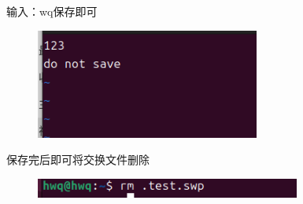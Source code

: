 \documentclass[a4paper, 12pt]{article}
\begin{document}
输入：wq保存即可
\begin{figure}[H]
    \centering
    \includegraphics[width=1\linewidth]{vim11.png}
\end{figure}
保存完后即可将交换文件删除
\begin{figure}
    \centering
    \includegraphics[width=1\linewidth]{vim12.png}
\end{figure}
\end{document}
